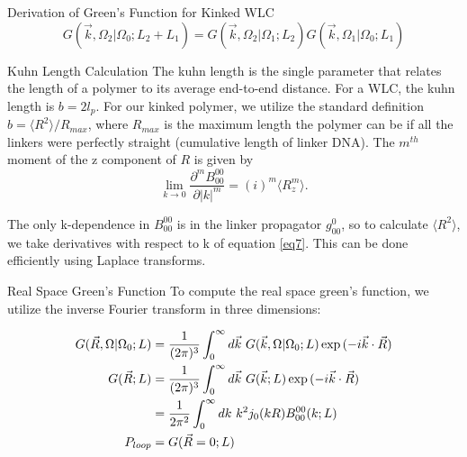 \documentclass[11pt]{article}
\begin{document}
\begin{flushleft}
\begin{section}{Derivation of Green's Function for Kinked WLC}
\begin{equation}\label{conv}
G(\vec{k}, \Omega_2 | \Omega_0; L_2+L_1) = G(\vec{k}, \Omega_2 | \Omega_1; L_2)G(\vec{k}, \Omega_1 | \Omega_0; L_1)
\end{equation}


\begin{subsection}{Kuhn Length Calculation}
The kuhn length is the single parameter that relates the length of a polymer to its average end-to-end distance. For a WLC, the kuhn length is $b=2l_p$. For our kinked polymer, we utilize the standard definition $b=\langle{R^2}\rangle/R_{max}$, where $R_{max}$ is the maximum length the polymer can be if all the linkers were perfectly straight (cumulative length of linker DNA). The $m^{th}$ moment of the z component of $R$ is given by
\begin{equation}\label{eq9}
\lim_{k\to0} \frac{\partial^m B_{00}^{00}}{\partial|k|^m}=(i)^m\langle{R_z^m}\rangle.
\end{equation}

The only k-dependence in $B_{00}^{00}$ is in the linker propagator $g_{00}^{0}$, so to calculate $\langle{R^2}\rangle$, we take derivatives with respect to k of equation \ref{eq7}. This can be done efficiently using Laplace transforms.
\end{subsection}

\begin{subsection}{Real Space Green's Function}
To compute the real space green's function, we utilize the inverse Fourier transform in three dimensions:

\begin{equation}\label{eq10}
\begin{aligned}
G(\vec{R}, \Omega | \Omega_0; L) &= \frac{1}{(2\pi)^3}\int_0^\infty d\vec{k}~G(\vec{k}, \Omega | \Omega_0; L) \exp{(-i\vec{k}\cdot\vec{R})}\\
G(\vec{R};L) &= \frac{1}{(2\pi)^3}\int_0^\infty d\vec{k}~G(\vec{k};L) \exp{(-i\vec{k}\cdot\vec{R})}\\
&= \frac{1}{2\pi^2}\int_0^\infty dk~k^2 j_0(kR) B_{00}^{00}(k;L)\\
P_{loop} &= G(\vec{R}=0; L)
\end{aligned}
\end{equation}

\end{subsection}

\end{section}

\end{flushleft}
\end{document}
